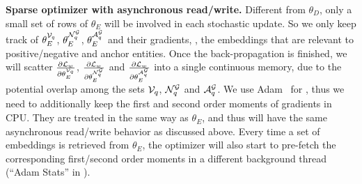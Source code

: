 \textbf{Sparse optimizer with asynchronous read/write.}
Different from $\theta_D$, only a small set of rows of $\theta_E$ will be involved in each stochastic update. So 
%
we only keep track of $\theta_E^{\mathcal{V}_q}$, $\theta_E^{\mathcal{N}_q^{\mathcal{G}}}$, $\theta_E^{\mathcal{A}_q^{\mathcal{G}}}$ and their gradients, \ie, the embeddings that are relevant to positive/negative and anchor entities. Once the back-propagation is finished, we will scatter $\frac{\partial \mathcal{L}_w}{\partial \theta_E^{\mathcal{V}_q}}$, $\frac{\partial \mathcal{L}_w}{\partial \theta_E^{\mathcal{N}_q^{\mathcal{G}}}}$ and $\frac{\partial \mathcal{L}_w}{\partial \theta_E^{\mathcal{A}_q^{\mathcal{G}}}}$ into a single continuous memory, due to the potential overlap among the sets $\mathcal{V}_q$, $\mathcal{N}_q^{\mathcal{G}}$ and $\mathcal{A}_q^{\mathcal{G}}$.
We use Adam~\citep{kingma2014adam} for \modelshort, thus we need to additionally keep the first and second order moments of gradients in CPU. They are treated in the same way as $\theta_E$, and thus will have the same asynchronous read/write behavior as discussed above.
% 
Every time a set of embeddings is retrieved from $\theta_E$, the optimizer will also start to pre-fetch the corresponding first/second order moments in a different background thread (``Adam Stats'' in ).  



